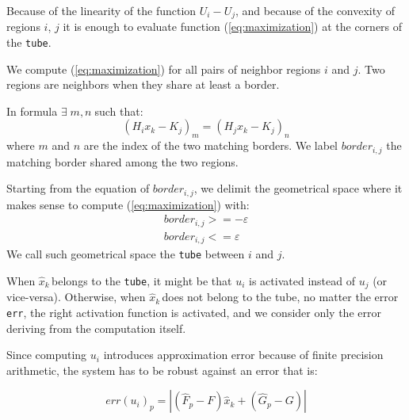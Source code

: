 \documentclass[sigconf]{acmart}
\newcommand{\statevar}{x_{k}}
\newcommand{\qstatevar}{\hat{x}_{k}}
\newcommand{\qstatevarmath}{$\hat{x}_{k}\,$}
\begin{document}
Because of the linearity of the function $U_{i}-U_{j}$, and because of the convexity of regions $i$, $j$ it is enough to evaluate function (\ref{eq:maximization}) at the corners of the \texttt{tube}.


We compute (\ref{eq:maximization}) for all pairs of neighbor regions $i$ and $j$. Two regions are neighbors when they share at least a border.

In formula $\exists\; m,n \;$such that:
\begin{equation}
(H_{i}\statevar-K_{j})_{m} = (H_{j}\statevar-K_{j})_{n}
\end{equation}
where $m$ and $n$ are the index of the two matching borders. We label $border_{i,j}$ the matching border shared among the two regions.

Starting from the equation of $border_{i,j}$, we delimit the geometrical space where it makes sense to compute (\ref{eq:maximization}) with: 
\begin{equation}
\begin{aligned}
border_{i,j} >= -\varepsilon\\
border_{i,j} <= \varepsilon
\end{aligned} 
\end{equation}
We call such geometrical space the \texttt{tube} between $i$ and $j$.

When \qstatevarmath belongs to the \texttt{tube}, it might be that $u_{i}$ is activated instead of $u_{j}$ (or vice-versa). Otherwise, when \qstatevarmath does not belong to the tube, no matter the error \texttt{err}, the right activation function is activated, and we consider only the error deriving from the computation itself.

Since computing $u_{i}$ introduces approximation error because of finite precision arithmetic, the system has to be robust against an error that is:

\begin{equation}\label{eq:fperror}
err(u_{i})_{p}=|(\hat{F}_{p}-F)\qstatevar+(\hat{G}_{p}-G)|
\end{equation}
\end{document}
